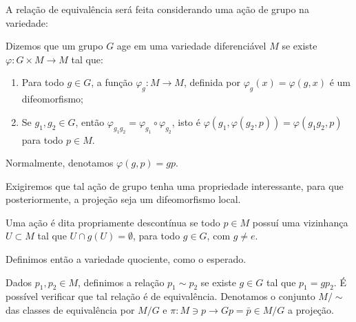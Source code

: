 	A relação de equivalência será feita considerando uma ação de grupo na variedade:
	\begin{definition}
		\label{def:acao-de-grupo}
		Dizemos que um grupo $G$ age em uma variedade diferenciável $M$ se existe $\varphi:G\times M\to M$ tal que:
		\begin{enumerate}[label=(\roman*)]
			\item Para todo $g \in G$, a função $\varphi_{g}:M\to M$, definida por $\varphi_{g}(x)=\varphi(g, x)$ é um difeomorfismo;
			\item Se $g_{1}, g_{2} \in G$, então $\varphi_{g_{1}g_{2}}=\varphi_{g_{1}}\circ\varphi_{g_{2}}$, isto é $\varphi(g_{1}, \varphi(g_{2}, p))=\varphi (g_{1}g_{2}, p)$ para todo $p \in M$.
		\end{enumerate}

		Normalmente, denotamos $\varphi(g,p)=gp$.
	\end{definition}
	Exigiremos que tal ação de grupo tenha uma propriedade interessante, para que posteriormente, a projeção seja um difeomorfismo local.
	\begin{definition}
		\label{def:acao-propriamente-descontinua}
		Uma ação é dita propriamente descontínua se todo $p \in M$ possuí uma vizinhança $U \subset M$ tal que $U \cap g(U)=\emptyset$, para todo $g \in G$, com $g\neq e$.
	\end{definition}
	Definimos então a variedade quociente, como o esperado.
	\begin{definition}
		\label{def:variedade-quociente}
		Dados $p_{1}, p_{2} \in M$, definimos a relação $p_{1} \sim  p_{2}$ se existe $g \in G$ tal que $p_{1}=gp_{2}$. É possível verificar que tal relação é de equivalência. Denotamos o conjunto $M/\sim$ das classes de equivalência por $M/G$ e $\pi:M \ni p\to Gp=\bar{p} \in M/G$ a projeção.
	\end{definition}
